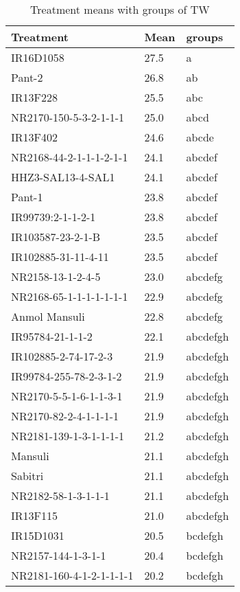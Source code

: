 \documentclass[]{article}
\begin{document}
\begin{longtable}{lll}
\caption{\label{tab:two-fac-groups-tab1}Treatment means with groups of TW}\\
\toprule
Treatment & Mean & groups\\
\midrule
\rowcolor{gray!6}  IR16D1058 & 27.5 & a\\
Pant-2 & 26.8 & ab\\
\rowcolor{gray!6}  IR13F228 & 25.5 & abc\\
NR2170-150-5-3-2-1-1-1 & 25.0 & abcd\\
\rowcolor{gray!6}  IR13F402 & 24.6 & abcde\\
\addlinespace
NR2168-44-2-1-1-1-2-1-1 & 24.1 & abcdef\\
\rowcolor{gray!6}  HHZ3-SAL13-4-SAL1 & 24.1 & abcdef\\
Pant-1 & 23.8 & abcdef\\
\rowcolor{gray!6}  IR99739:2-1-1-2-1 & 23.8 & abcdef\\
IR103587-23-2-1-B & 23.5 & abcdef\\
\addlinespace
\rowcolor{gray!6}  IR102885-31-11-4-11 & 23.5 & abcdef\\
NR2158-13-1-2-4-5 & 23.0 & abcdefg\\
\rowcolor{gray!6}  NR2168-65-1-1-1-1-1-1-1 & 22.9 & abcdefg\\
Anmol Mansuli & 22.8 & abcdefg\\
\rowcolor{gray!6}  IR95784-21-1-1-2 & 22.1 & abcdefgh\\
\addlinespace
IR102885-2-74-17-2-3 & 21.9 & abcdefgh\\
\rowcolor{gray!6}  IR99784-255-78-2-3-1-2 & 21.9 & abcdefgh\\
NR2170-5-5-1-6-1-1-3-1 & 21.9 & abcdefgh\\
\rowcolor{gray!6}  NR2170-82-2-4-1-1-1-1 & 21.9 & abcdefgh\\
NR2181-139-1-3-1-1-1-1 & 21.2 & abcdefgh\\
\addlinespace
\rowcolor{gray!6}  Mansuli & 21.1 & abcdefgh\\
Sabitri & 21.1 & abcdefgh\\
\rowcolor{gray!6}  NR2182-58-1-3-1-1-1 & 21.1 & abcdefgh\\
IR13F115 & 21.0 & abcdefgh\\
\rowcolor{gray!6}  IR15D1031 & 20.5 & bcdefgh\\
\addlinespace
NR2157-144-1-3-1-1 & 20.4 & bcdefgh\\
\rowcolor{gray!6}  NR2181-160-4-1-2-1-1-1-1 & 20.2 & bcdefgh\\

\end{longtable}
\end{document}
